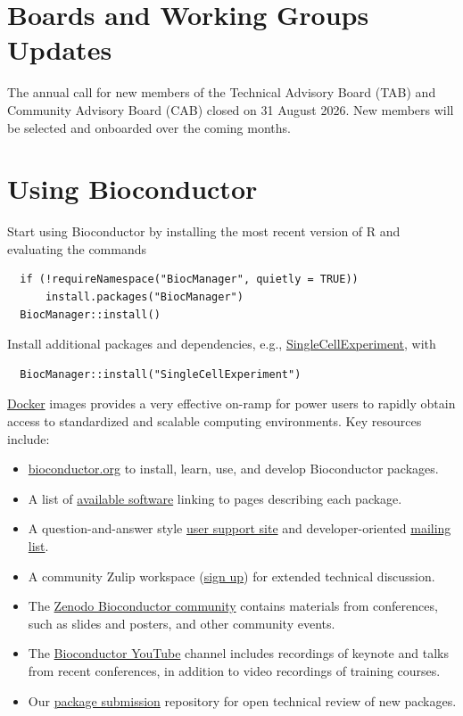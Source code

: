 \section{Boards and Working Groups Updates}\label{boards-and-working-groups-updates}

The annual call for new members of the Technical Advisory Board (TAB) and Community Advisory Board (CAB) closed on 31 August 2026. New members will be selected and onboarded over the coming months.

\section{Using Bioconductor}\label{using-bioconductor}

Start using
Bioconductor by installing the most recent version of R and evaluating
the commands

\begin{verbatim}
  if (!requireNamespace("BiocManager", quietly = TRUE))
      install.packages("BiocManager")
  BiocManager::install()
\end{verbatim}

Install additional packages and dependencies,
e.g., \href{https://bioconductor.org/packages/SingleCellExperiment}{SingleCellExperiment}, with

\begin{verbatim}
  BiocManager::install("SingleCellExperiment")
\end{verbatim}

\href{https://bioconductor.org/help/docker/}{Docker}
images provides a very effective on-ramp for power users to rapidly
obtain access to standardized and scalable computing environments.
Key resources include:

\begin{itemize}
\tightlist
\item
  \href{https://bioconductor.org}{bioconductor.org} to install,
  learn, use, and develop Bioconductor packages.
\item
  A list of \href{https://bioconductor.org/packages}{available software}
  linking to pages describing each package.
\item
  A question-and-answer style
  \href{https://support.bioconductor.org}{user support site} and
  developer-oriented \href{https://stat.ethz.ch/mailman/listinfo/bioc-devel}{mailing list}.
\item
  A community Zulip workspace (\href{https://chat.bioconductor.org}{sign up})
  for extended technical discussion.
\item
  The \href{https://zenodo.org/communities/bioconductor}{Zenodo Bioconductor community} contains materials from conferences, such as slides and posters, and other community events.
\item
  The \href{https://www.youtube.com/user/bioconductor}{Bioconductor YouTube}
  channel includes recordings of keynote and talks from recent
  conferences, in addition to
  video recordings of training courses.
\item
  Our \href{https://github.com/Bioconductor/BiocContributions}{package submission}
  repository for open technical review of new packages.
\end{itemize}

